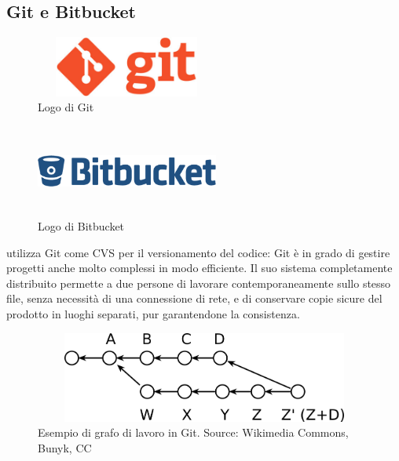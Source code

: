    \subsection{Git e Bitbucket}
   \begin{figure}[htbp]
      \begin{center}
         \includegraphics[width=6cm,height=2cm,keepaspectratio]{immagini/git-logo}
      \end{center}
      \caption{Logo di Git}\label{logogit}
   \end{figure}
   \begin{figure}[htbp]
      \begin{center}
         \includegraphics[width=6cm,height=3cm,keepaspectratio]{immagini/bitbucket-logo}
      \end{center}
      \caption{Logo di Bitbucket}\label{logobitbucket}
   \end{figure}
   \nomeAzienda{} utilizza Git come \gls{CVS} per il versionamento del codice: Git è in grado di gestire progetti anche molto complessi in modo efficiente. Il suo sistema completamente distribuito permette a due persone di lavorare contemporaneamente sullo stesso file, senza necessità di una connessione di rete, e di conservare copie sicure del prodotto in luoghi separati, pur garantendone la consistenza.\\
   \begin{figure}[htbp]
      \begin{center}
         \includegraphics[width=15cm,height=3cm,keepaspectratio]{immagini/git-branches}
      \end{center}
      \caption{Esempio di grafo di lavoro in Git. Source: Wikimedia Commons, Bunyk, CC}\label{grafogit}
   \end{figure}
